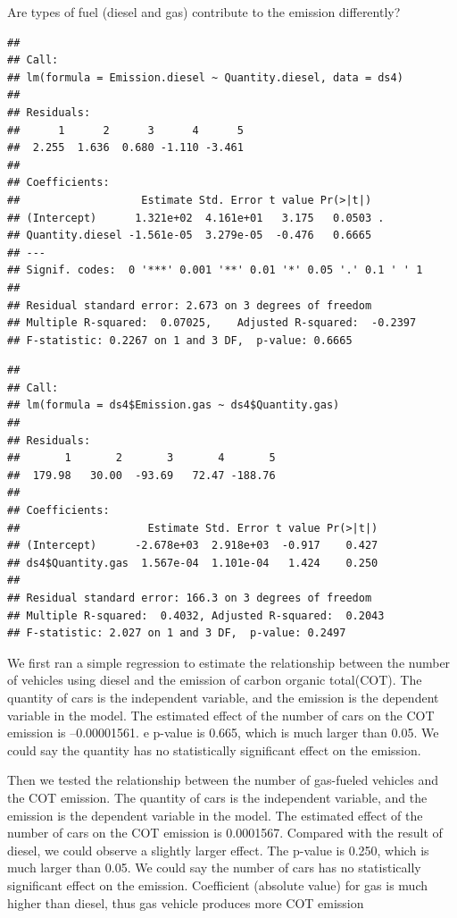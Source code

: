 \documentclass[
  12pt,
]{article}
\begin{document}
Are types of fuel (diesel and gas) contribute to the emission
differently?

\begin{verbatim}
## 
## Call:
## lm(formula = Emission.diesel ~ Quantity.diesel, data = ds4)
## 
## Residuals:
##      1      2      3      4      5 
##  2.255  1.636  0.680 -1.110 -3.461 
## 
## Coefficients:
##                   Estimate Std. Error t value Pr(>|t|)  
## (Intercept)      1.321e+02  4.161e+01   3.175   0.0503 .
## Quantity.diesel -1.561e-05  3.279e-05  -0.476   0.6665  
## ---
## Signif. codes:  0 '***' 0.001 '**' 0.01 '*' 0.05 '.' 0.1 ' ' 1
## 
## Residual standard error: 2.673 on 3 degrees of freedom
## Multiple R-squared:  0.07025,    Adjusted R-squared:  -0.2397 
## F-statistic: 0.2267 on 1 and 3 DF,  p-value: 0.6665
\end{verbatim}

\begin{verbatim}
## 
## Call:
## lm(formula = ds4$Emission.gas ~ ds4$Quantity.gas)
## 
## Residuals:
##       1       2       3       4       5 
##  179.98   30.00  -93.69   72.47 -188.76 
## 
## Coefficients:
##                    Estimate Std. Error t value Pr(>|t|)
## (Intercept)      -2.678e+03  2.918e+03  -0.917    0.427
## ds4$Quantity.gas  1.567e-04  1.101e-04   1.424    0.250
## 
## Residual standard error: 166.3 on 3 degrees of freedom
## Multiple R-squared:  0.4032, Adjusted R-squared:  0.2043 
## F-statistic: 2.027 on 1 and 3 DF,  p-value: 0.2497
\end{verbatim}

We first ran a simple regression to estimate the relationship between
the number of vehicles using diesel and the emission of carbon organic
total(COT). The quantity of cars is the independent variable, and the
emission is the dependent variable in the model. The estimated effect of
the number of cars on the COT emission is --0.00001561. e p-value is
0.665, which is much larger than 0.05. We could say the quantity has no
statistically significant effect on the emission.

Then we tested the relationship between the number of gas-fueled
vehicles and the COT emission. The quantity of cars is the independent
variable, and the emission is the dependent variable in the model. The
estimated effect of the number of cars on the COT emission is 0.0001567.
Compared with the result of diesel, we could observe a slightly larger
effect. The p-value is 0.250, which is much larger than 0.05. We could
say the number of cars has no statistically significant effect on the
emission. Coefficient (absolute value) for gas is much higher than
diesel, thus gas vehicle produces more COT emission
\end{document}
